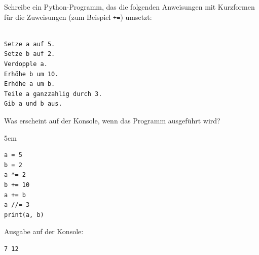 \question[4]
Schreibe ein Python-Programm, das die folgenden Anweisungen mit Kurzformen
für die Zuweisungen (zum Beispiel \texttt{+=}) umsetzt:
\begin{lstlisting}

Setze a auf 5.
Setze b auf 2.
Verdopple a.
Erhöhe b um 10.
Erhöhe a um b.
Teile a ganzzahlig durch 3.
Gib a und b aus.
\end{lstlisting}

Was erscheint auf der Konsole, wenn das Programm ausgeführt wird?
\begin{solutionbox}{5cm}
\begin{lstlisting}
a = 5
b = 2
a *= 2
b += 10
a += b
a //= 3
print(a, b)
\end{lstlisting}
Ausgabe auf der Konsole:
\begin{lstlisting}
7 12
\end{lstlisting}
\end{solutionbox}